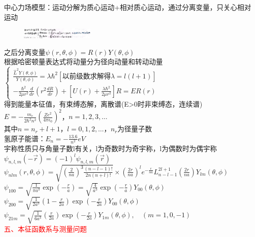 \documentclass[a4paper,8pt]{extarticle} %
\newcommand{\redtext}[1]{\textcolor{red}{#1}}
\begin{document}
\begin{multicols}{3}
中心力场模型：运动分解为质心运动+相对质心运动，通过分离变量，只关心相对运动\\
\begin{figure}[H]
    \vspace{-0.5cm}
    \centering
    \includegraphics[width=0.32\textwidth]{images/30.png}
    \vspace{-0.6cm}
\end{figure}
之后分离变量$\psi(r,\theta,\phi) = R(r)Y(\theta,\phi)$\\
根据哈密顿量表达式将动量分为径向动量和转动动量\\
$\begin{cases}
    \frac{\hat{L}^2Y(\theta,\phi)}{Y(\theta,\phi)} = \lambda\hbar^2\left[\text{以前级数求解得}\lambda = l(l+1)\right] \\[2ex]
    -\frac{\hbar^2}{2\mu r^2}\frac{d}{dr}\left(r^2\frac{dR}{dr}\right) + \left[U(r) + \frac{\lambda\hbar^2}{2\mu r^2}\right]R = ER(r)
    \end{cases}$\\
得到能量本征值，有束缚态解，离散谱(E>0时非束缚态，连续谱)\\
$E = -\frac{m_e}{2\hbar^2n^2}(\frac{Ze^2}{4\pi\epsilon_0})^2$，$n=1,2,3,\dots$\\
其中$n=n_r+l+1$，$l=0,1,2,\dots$，$n_r$为径量子数\\
氢原子能谱：$E_n = -\frac{13.6}{n^2}eV$\\
宇称性质只与角量子数l有关，l为奇数时为奇宇称，l为偶数时为偶宇称\\
$\psi_{n,l,m}(-\vec{r}) = (-1)^l\psi_{n,l,m}(\vec{r})$\\
$\psi_{nlm}(r,\theta,\phi) = \sqrt{\left(\frac{2}{na}\right)^3 \frac{(n-l-1)!}{2n(n+l)!}} \times \left(\frac{2r}{na}\right)^l e^{-\frac{r}{na}} L_{n-l-1}^{2l+1}\left(\frac{2r}{na}\right)Y_{lm}(\theta,\phi)$\\
$\psi_{100} = \sqrt{\frac{1}{\pi a^3}}\exp\left(-\frac{r}{a}\right) = \sqrt{\frac{4}{a^3}}\exp\left(-\frac{r}{a}\right)Y_{00}(\theta,\phi)$\\
$\psi_{200} = \sqrt{\frac{1}{2a^3}}\left(1-\frac{r}{2a}\right)\exp\left(-\frac{r}{2a}\right)Y_{00}(\theta,\phi)$\\
$\psi_{21m} = \sqrt{\frac{1}{6a^3}}\left(\frac{r}{2a}\right)\exp\left(-\frac{r}{2a}\right)Y_{1m}(\theta,\phi), \quad (m=1,0,-1)$\\
\redtext{五、本征函数系与测量问题}


\end{multicols}
\end{document}

